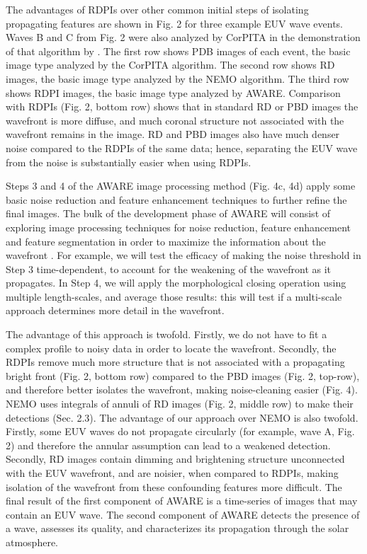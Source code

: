 The advantages of RDPIs over other common initial steps of isolating propagating features are shown in Fig. 2 for three example EUV wave events. Waves B and C from Fig. 2 were also analyzed by CorPITA in the demonstration of that algorithm by \citet{2014SoPh..289.3279L}.  The first row shows PDB images of each event, the basic image type analyzed by the CorPITA algorithm.  The second row shows RD images, the basic image type analyzed by the NEMO algorithm.  The third row shows RDPI images, the basic image type analyzed by AWARE. Comparison with RDPIs (Fig. 2, bottom row) shows that in standard RD or PBD images the wavefront is more diffuse, and much coronal structure not associated with the wavefront remains in the image. RD and PBD images also have much denser noise compared to the RDPIs of the same data; hence, separating the EUV wave from the noise is substantially easier when using RDPIs.   

Steps 3 and 4 of the AWARE image processing method (Fig. 4c, 4d) apply some basic noise reduction and feature enhancement techniques to further refine the final images.  The bulk of the development phase of AWARE will consist of exploring image processing techniques for noise reduction, feature enhancement and feature segmentation in order to maximize the information about the wavefront \citep[see][ch. 3, 4, 5, 9 \& 10 for many potential improvements]{2002dip..book.....G}.  For example, we will test the efficacy of making the noise threshold in Step 3 time-dependent, to account for the weakening of the wavefront as it propagates.  In Step 4, we will apply the morphological closing operation using multiple length-scales, and average those results: this will test if a multi-scale approach determines more detail in the wavefront.


The advantage of this approach is twofold. Firstly, we do not have to fit a complex profile to noisy data in order to locate the wavefront. Secondly, the RDPIs remove much more structure that is not associated with a propagating bright front (Fig. 2, bottom row) compared to the PBD images (Fig. 2, top-row), and therefore better isolates the wavefront, making noise-cleaning easier (Fig. 4).  NEMO \citep{2005SoPh..228..265P} uses integrals of annuli of RD images (Fig. 2, middle row) to make their detections (Sec. 2.3).  The advantage of our approach over NEMO is also twofold.  Firstly, some EUV waves do not propagate circularly (for example, wave A, Fig. 2) and therefore the annular assumption can lead to a weakened detection.  Secondly, RD images contain dimming and brightening structure unconnected with the EUV wavefront, and are noisier,  when compared to RDPIs, making isolation of the wavefront from these confounding features more difficult. The final result of the first component of AWARE is a time-series of images that may contain an EUV wave.  The second component of AWARE detects the presence of a wave, assesses its quality, and characterizes its propagation through the solar atmosphere.
